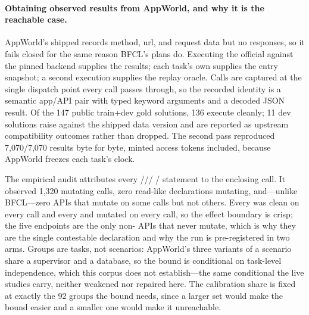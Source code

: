 \paragraph{Obtaining observed results from AppWorld, and why it is the reachable case.}
AppWorld's shipped  records method, url, and request data but
no responses, so it fails closed for the same reason BFCL's plans do. Executing
the official  against the pinned
 backend supplies the results; each task's own 
supplies the entry snapshot; a second execution supplies the replay oracle. Calls
are captured at the single dispatch point every  call
passes through, so the recorded identity is a semantic app/API pair with typed
keyword arguments and a decoded JSON result. Of the 147 public train+dev gold
solutions, 136 execute cleanly; 11 dev solutions raise against the shipped data
version and are reported as upstream compatibility outcomes rather than dropped.
The second pass reproduced 7{,}070/7{,}070 results byte for byte, minted access
tokens included, because AppWorld freezes each task's clock.

The empirical audit attributes every ///
/ statement to the enclosing call. It observed 1{,}320
mutating calls, zero read-like declarations mutating, and---unlike BFCL---zero APIs
that mutate on some calls but not others. Every  was clean on every call
and every  and  mutated on every call, so the effect
boundary is crisp; the five  endpoints are the only non-
APIs that never mutate, which is why they are the single contestable declaration
and why the run is pre-registered in two arms. Groups are tasks, not scenarios:
AppWorld's three variants of a scenario share a supervisor and a database, so the
bound is conditional on task-level independence, which this corpus does not
establish---the same conditional the live studies carry, neither weakened nor
repaired here. The calibration share is fixed at exactly the 92 groups the bound
needs, since a larger set would make the bound easier and a smaller one would make
it unreachable.

\begin{table}[t]
  \centering
  \caption{Structural dispatch eligibility of the admitted AppWorld artifact on
  the 28 released official baseline runs. Eligibility is the admitted program's
  exact call sequence at normalized position~0; it is an upper bound on $\phi$,
  because the manifest check and the calibrated gate are not evaluated and the
  released logs retain API calls rather than model boundaries. Trajectories repeat
  tasks across runs and are descriptive rather than independent samples. A miss
  abstains to the unchanged agent.}
  \label{tab:appworld-dispatch}
  \footnotesize
  \setlength{\tabcolsep}{5pt}
  
\end{table}

